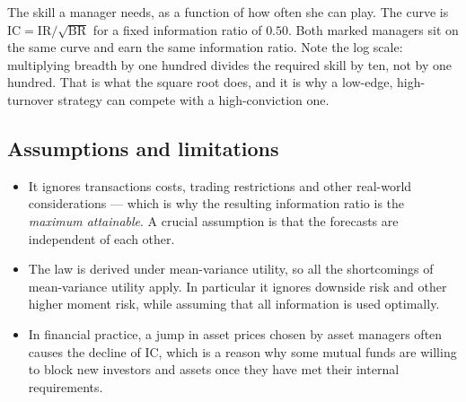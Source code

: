 %
{The skill a manager needs, as a function of how often she can play. The curve is
$\text{IC} = \text{IR}/\sqrt{\text{BR}}$ for a fixed information ratio of $0.50$.
Both marked managers sit on the same curve and earn the same information ratio.
Note the log scale: multiplying breadth by one hundred divides the required skill
by ten, not by one hundred. That is what the square root does, and it is why a
low-edge, high-turnover strategy can compete with a high-conviction one.}

\subsection{Assumptions and limitations}

\begin{itemize}
\item {} It ignores transactions costs, trading restrictions and
other real-world considerations --- which is why the resulting information ratio
is the \emph{maximum attainable}. A crucial assumption is that the forecasts are
independent of each other.
\item {} The law is derived under mean-variance utility, so all
the shortcomings of mean-variance utility apply. In particular it ignores
downside risk and other higher moment risk, while assuming that all information
is used optimally.
\item In financial practice, a jump in asset prices chosen by asset managers often
causes the decline of IC, which is a reason why some mutual funds are willing to
block new investors and assets once they have met their internal requirements.
\end{itemize}


